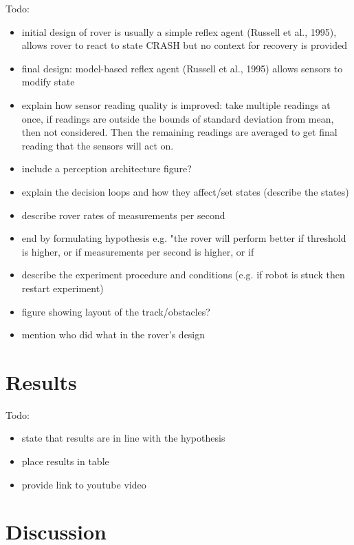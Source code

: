\documentclass[a4paper,12pt,twocolumn]{article}
\begin{document}
Todo:
\begin{itemize}
    \item initial design of rover is usually a simple reflex agent (Russell et al., 1995), allows rover to react to state CRASH but no context for recovery is provided
    \item final design: model-based reflex agent (Russell et al., 1995) allows sensors to modify state
    \item explain how sensor reading quality is improved: take multiple readings at once, if readings are outside the bounds of standard deviation from mean, then not considered. Then the remaining readings are averaged to get final reading that the sensors will act on.
    \item include a perception architecture figure?
    \item explain the decision loops and how they affect/set states (describe the states)
    \item describe rover rates of measurements per second
    \item end by formulating hypothesis e.g. "the rover will perform better if threshold is higher, or if measurements per second is higher, or if 
    \item describe the experiment procedure and conditions (e.g. if robot is stuck then restart experiment)
    \item figure showing layout of the track/obstacles?
    \item mention who did what in the rover's design
\end{itemize}


\section{Results}

Todo:
\begin{itemize}
    \item state that results are in line with the hypothesis
    \item place results in table
    \item provide link to youtube video
\end{itemize}


\section{Discussion}
\end{document}
